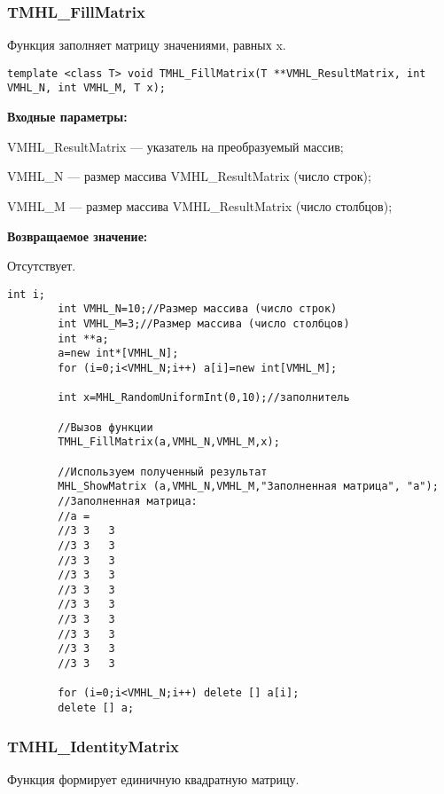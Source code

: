 \documentclass[a4paper,12pt]{article}
\begin{document}
\subsubsection{TMHL\_FillMatrix}\label{TMHL_FillMatrix}

Функция заполняет матрицу значениями, равных x.


\begin{lstlisting}[label=code_syntax_TMHL_FillMatrix,caption=Синтаксис]
template <class T> void TMHL_FillMatrix(T **VMHL_ResultMatrix, int VMHL_N, int VMHL_M, T x);
\end{lstlisting}

\textbf{Входные параметры:}

 VMHL\_ResultMatrix --- указатель на преобразуемый массив;
 
 VMHL\_N --- размер массива VMHL\_ResultMatrix (число строк);
 
 VMHL\_M --- размер массива VMHL\_ResultMatrix (число столбцов);

\textbf{Возвращаемое значение:}

Отсутствует.


\begin{lstlisting}[label=code_use_TMHL_FillMatrix,caption=Пример использования]
        int i;
        int VMHL_N=10;//Размер массива (число строк)
        int VMHL_M=3;//Размер массива (число столбцов)
        int **a;
        a=new int*[VMHL_N];
        for (i=0;i<VMHL_N;i++) a[i]=new int[VMHL_M];

        int x=MHL_RandomUniformInt(0,10);//заполнитель

        //Вызов функции
        TMHL_FillMatrix(a,VMHL_N,VMHL_M,x);

        //Используем полученный результат
        MHL_ShowMatrix (a,VMHL_N,VMHL_M,"Заполненная матрица", "a");
        //Заполненная матрица:
        //a =	
        //3	3	3
        //3	3	3
        //3	3	3
        //3	3	3
        //3	3	3
        //3	3	3
        //3	3	3
        //3	3	3
        //3	3	3
        //3	3	3

        for (i=0;i<VMHL_N;i++) delete [] a[i];
        delete [] a;
\end{lstlisting}

\subsubsection{TMHL\_IdentityMatrix}\label{TMHL_IdentityMatrix}

Функция формирует единичную квадратную матрицу.
\end{document}
